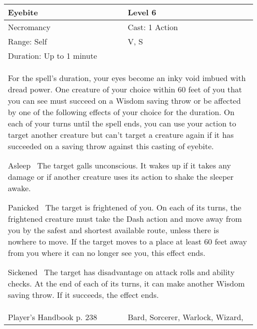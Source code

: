 \documentclass[11pt]{report}
\begin{document}
\begin{table}[H]
	\begin{tabular}{||p{6cm}|p{6cm}||}
		\hline\hline
		\bf{Eyebite} & Level 6\\ \hline
		Necromancy & Cast: 1 Action\\ \hline
		Range: Self & V, S\\ \hline
		Duration: Up to 1 minute & \\ \hline
		\multicolumn{2}{||p{12cm}||}{For the spell’s duration, your eyes become an inky void imbued with dread power. One creature of your choice within 60 feet of you that you can see must succeed on a Wisdom saving throw or be affected by one of the following effects of your choice for the duration. On each of your turns until the spell ends, you can use your action to target another creature but can’t target a creature again if it has succeeded on a saving throw against this casting of eyebite. 

Asleep 
The target galls unconscious. It wakes up if it takes any damage or if another creature uses its action to shake the sleeper awake. 

Panicked 
The target is frightened of you. On each of its turns, the frightened creature must take the Dash action and move away from you by the safest and shortest available route, unless there is nowhere to move. If the target moves to a place at least 60 feet away from you where it can no longer see you, this effect ends. 

Sickened 
The target has disadvantage on attack rolls and ability checks. At the end of each of its turns, it can make another Wisdom saving throw. If it succeeds, the effect ends.}\\ \hline
Player's Handbook p. 238 & Bard, Sorcerer, Warlock, Wizard, \\ \hline\hline
	\end{tabular}
\end{table}
\end{document}

